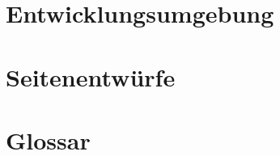 \documentclass[parskip=full,11pt,twoside]{scrartcl}
\begin{document}
\section{Entwicklungsumgebung}

\pagebreak
\appendix

\section{Seitenentwürfe}




\section{Glossar}

\end{document}
